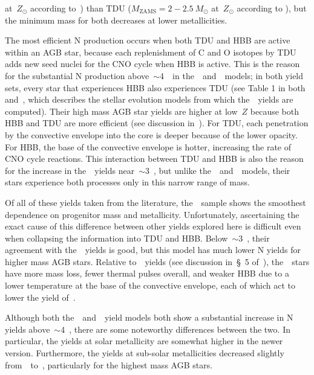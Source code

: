 \documentclass[ms.tex]{subfiles}
\begin{document}
at~$Z_\odot$ according to~\citealt{Karakas2010}) than TDU
($M_\text{ZAMS} = 2 - 2.5~M_\odot$ at~$Z_\odot$ according to
\citealt{Karakas2010}), but the minimum mass for both decreases at lower
metallicities.
\par
The most efficient N production occurs when both TDU and HBB are active within
an AGB star, because each replenishment of C and O isotopes by TDU adds new
seed nuclei for the CNO cycle when HBB is active.
This is the reason for the substantial N production above~$\sim$4~\msun~in
the~\karakasten~and~\karakas~models; in both yield sets, every star that
experiences HBB also experiences TDU (see Table 1 in both~\citealt{Karakas2010}
and~\citealt{Karakas2014}, which describes the stellar evolution models from
which the~\karakas~yields are computed).
Their high mass AGB star yields are higher at low~$Z$ because both HBB and TDU
are more efficient (see discussion in~\citealp{Ventura2013}).
For TDU, each penetration by the convective envelope into the core is deeper
because of the lower opacity.
For HBB, the base of the convective envelope is hotter, increasing the rate
of CNO cycle reactions.
This interaction between TDU and HBB is also the reason for the increase in
the~\ventura~yields near~$\sim$3~\msun, but unlike
the~\karakasten~and~\karakas~models, their stars experience both processes only
in this narrow range of mass.
\par
Of all of these yields taken from the literature, the~\cristallo~sample shows
the smoothest dependence on progenitor mass and metallicity.
Unfortunately, ascertaining the exact cause of this difference between other
yields explored here is difficult even when collapsing the information into
TDU and HBB.
Below~$\sim$3~\msun, their agreement with the~\karakas~yields is good, but this
model has much lower N yields for higher mass AGB stars.
Relative to~\karakas~yields (see discussion in~\S~5 of~\citealp{Karakas2016}),
the~\cristallo~stars have more mass loss, fewer thermal pulses overall, and
weaker HBB due to a lower temperature at the base of the convective envelope,
each of which act to lower the yield of~\Nfourteen.
\par
Although both the~\karakasten~and~\karakas~yield models both show a substantial
increase in N yields above~$\sim$4~\msun, there are some noteworthy differences
between the two.
In particular, the yields at solar metallicity are somewhat higher in the
newer version.
Furthermore, the yields at sub-solar metallicities decreased slightly
from~\karakasten~to~\karakas, particularly for the highest mass AGB stars.
\end{document}

